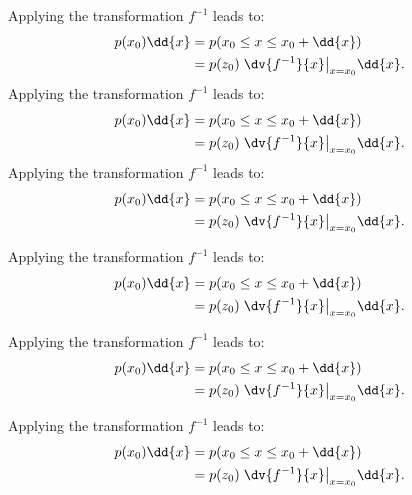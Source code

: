 Applying the transformation $f^{-1}$ leads to:
\begin{align}
\begin{aligned}
p(x_{0}) \dd{x} &= p(x_{0} \leq x \leq x_{0} + \dd{x})  \\
&= p(z_{0})\left.\dv{f^{-1}}{x}\right|_{x=x_{0}}\!\dd{x}.
\end{aligned}
\end{align}
Applying the transformation $f^{-1}$ leads to:
\begin{align}
\begin{aligned}
p(x_{0}) \dd{x} &= p(x_{0} \leq x \leq x_{0} + \dd{x})  \\
&= p(z_{0})\left.\dv{f^{-1}}{x}\right|_{x=x_{0}}\!\dd{x}.
\end{aligned}
\end{align}
Applying the transformation $f^{-1}$ leads to:
\begin{align}
\begin{aligned}
p(x_{0}) \dd{x} &= p(x_{0} \leq x \leq x_{0} + \dd{x})  \\
&= p(z_{0})\left.\dv{f^{-1}}{x}\right|_{x=x_{0}}\!\dd{x}.
\end{aligned}
\end{align}
\begin{frame}[t]
Applying the transformation $f^{-1}$ leads to:
\begin{align}
\begin{aligned}
p(x_{0}) \dd{x} &= p(x_{0} \leq x \leq x_{0} + \dd{x})  \\
&= p(z_{0})\left.\dv{f^{-1}}{x}\right|_{x=x_{0}}\!\dd{x}.
\end{aligned}
\end{align}
\end{frame}

\begin{frame}[t]
Applying the transformation $f^{-1}$ leads to:
\begin{align}
\begin{aligned}
p(x_{0}) \dd{x} &= p(x_{0} \leq x \leq x_{0} + \dd{x})  \\
&= p(z_{0})\left.\dv{f^{-1}}{x}\right|_{x=x_{0}}\!\dd{x}.
\end{aligned}
\end{align}
\end{frame}

\begin{frame}[t]
Applying the transformation $f^{-1}$ leads to:
\begin{align}
\begin{aligned}
p(x_{0}) \dd{x} &= p(x_{0} \leq x \leq x_{0} + \dd{x})  \\
&= p(z_{0})\left.\dv{f^{-1}}{x}\right|_{x=x_{0}}\!\dd{x}.
\end{aligned}
\end{align}
\end{frame}


